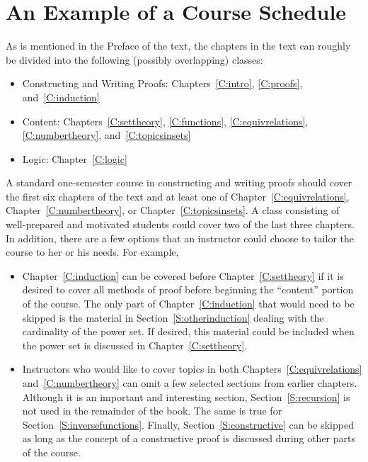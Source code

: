 \section*{An Example of a Course Schedule}
As is mentioned in the Preface of the text, the chapters in the text can roughly be divided into the following (possibly overlapping) classes:

\begin{itemize}
\item Constructing and Writing Proofs:  Chapters~\ref{C:intro}, \ref{C:proofs}, and~\ref{C:induction}
\item Content: Chapters~\ref{C:settheory}, \ref{C:functions}, \ref{C:equivrelations}, \ref{C:numbertheory}, and~\ref{C:topicsinsets}
\item Logic: Chapter~\ref{C:logic}
\end{itemize}

A standard one-semester course in constructing and writing proofs should cover the first six chapters of the text and at least one of Chapter~\ref{C:equivrelations}, Chapter~\ref{C:numbertheory}, or Chapter~\ref{C:topicsinsets}.  A class consisting of well-prepared and motivated students could cover two of the last three chapters.  In addition, there are a few options that an instructor could choose to tailor the course to her or his needs.  For example,

\begin{itemize}
\item Chapter~\ref{C:induction} can be covered before Chapter~\ref{C:settheory} if it is desired to cover all methods of proof before beginning the ``content'' portion of the course.  The only part of Chapter~\ref{C:induction} that would need to be skipped is the material in Section~\ref{S:otherinduction} dealing with the cardinality of the power set.  If desired, this material could be included when the power set is discussed in Chapter~\ref{C:settheory}.

\item Instructors who would like to cover topics in both Chapters~\ref{C:equivrelations} and~\ref{C:numbertheory} can omit a few selected sections from earlier chapters.  Although it is an important and interesting section, Section~\ref{S:recursion} is not used in the remainder of the book.  The same is true for Section~\ref{S:inversefunctions}.  Finally, 
Section~\ref{S:constructive} can be skipped as long as the concept of a constructive proof is discussed during other parts of the course.
\end{itemize}

